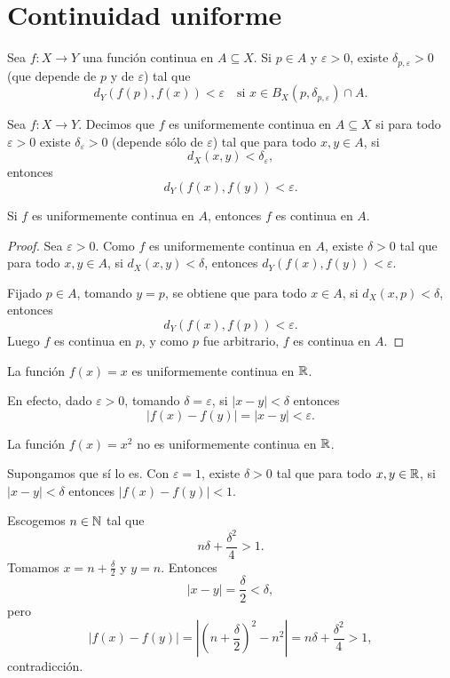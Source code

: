 \section{Continuidad uniforme}

\begin{remark}
Sea $f:X\to Y$ una función continua en $A\subseteq X$.
Si $p\in A$ y $\varepsilon>0$, existe $\delta_{p,\varepsilon}>0$ (que depende de $p$ y de $\varepsilon$)
tal que
\[
d_Y(f(p),f(x))<\varepsilon \quad \text{si } x\in B_X(p,\delta_{p,\varepsilon})\cap A.
\]
\end{remark}

\begin{definicion}
Sea $f:X\to Y$. Decimos que $f$ es uniformemente continua en $A\subseteq X$ si para todo $\varepsilon>0$ existe $\delta_\varepsilon>0$ (depende sólo de $\varepsilon$) tal que para todo $x,y\in A$, si
\[
d_X(x,y)<\delta_\varepsilon,
\]
entonces
\[
d_Y(f(x),f(y))<\varepsilon.
\]
\end{definicion}

\begin{remark}
Si $f$ es uniformemente continua en $A$, entonces $f$ es continua en $A$.
\end{remark}

\begin{proof}
Sea $\varepsilon>0$. Como $f$ es uniformemente continua en $A$, existe $\delta>0$ tal que para todo $x,y\in A$, si $d_X(x,y)<\delta$, entonces $d_Y(f(x),f(y))<\varepsilon$.

Fijado $p\in A$, tomando $y=p$, se obtiene que para todo $x\in A$, si $d_X(x,p)<\delta$, entonces
\[
d_Y(f(x),f(p))<\varepsilon.
\]
Luego $f$ es continua en $p$, y como $p$ fue arbitrario, $f$ es continua en $A$.
\end{proof}

\begin{example}
La función $f(x)=x$ es uniformemente continua en $\mathbb{R}$.

En efecto, dado $\varepsilon>0$, tomando $\delta=\varepsilon$, si $|x-y|<\delta$ entonces
\[
|f(x)-f(y)|=|x-y|<\varepsilon.
\]
\end{example}

\begin{example}
La función $f(x)=x^2$ no es uniformemente continua en $\mathbb{R}$.

Supongamos que sí lo es. Con $\varepsilon=1$, existe $\delta>0$ tal que para todo $x,y\in\mathbb{R}$, si $|x-y|<\delta$ entonces $|f(x)-f(y)|<1$.

Escogemos $n\in\mathbb{N}$ tal que
\[
n\delta+\frac{\delta^2}{4}>1.
\]
Tomamos $x=n+\frac{\delta}{2}$ y $y=n$. Entonces
\[
|x-y|=\frac{\delta}{2}<\delta,
\]
pero
\[
|f(x)-f(y)|=\left|\left(n+\frac{\delta}{2}\right)^2-n^2\right|=n\delta+\frac{\delta^2}{4}>1,
\]
contradicción.
\end{example}

